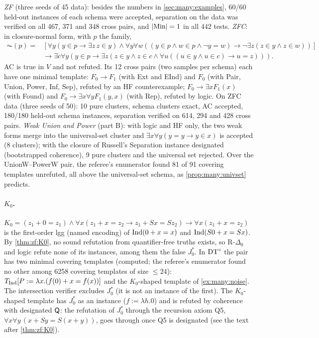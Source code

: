 \begin{example}\label{ex:many:zf}
\emph{ZF} (three seeds of 45 data): besides the numbers in \cref{sec:many:examples}, 60/60 held-out instances of each
schema were accepted, separation on the data was verified on all 467, 371 and 348 cross pairs, and $|\mathrm{Min}|=1$ in all 442
tests. \emph{ZFC}: in closure-normal form, with $p$ the family,
\begin{align*}
\AC(p)={}&[\forall y(y\in p\to\exists z\,z\in y)\wedge\forall y\forall w((y\in p\wedge w\in p\wedge\neg y=w)\to\neg\exists z(z\in y\wedge z\in w))]\\
&\to\exists c\forall y(y\in p\to\exists z(z\in y\wedge z\in c\wedge\forall u((u\in y\wedge u\in c)\to u=z))).
\end{align*} AC is true in $V$ and not
refuted. Its 12 cross pairs (two samples per schema) each have one minimal template: $F_0\to F_1$ (with Ext and EInd) and
$F_0$ (with Pair, Union, Power, Inf, Sep), refuted by an HF counterexample; $F_0\to\exists xF_1(x)$ (with Found) and
$F_0\to\exists x\forall yF_1(y,x)$ (with Rep), refuted by logic. On ZFC data (three seeds of 50): 10 pure clusters, schema clusters exact, AC
accepted, 180/180 held-out schema instances, separation verified on 614, 294 and 428 cross pairs. \emph{Weak Union and Power} (part B): with logic and HF only, the two weak
forms merge into the universal-set cluster and $\exists x\forall y(y=y\to y\in x)$ is accepted (8 clusters); with the closure of
Russell's Separation instance designated (bootstrapped coherence), 9 pure clusters and the universal set rejected. Over the
UnionW--PowerW pair, the referee's enumerator found 81 of 91 covering templates unrefuted, all above the universal-set
schema, as \cref{prop:many:univset} predicts.
\end{example}

\paragraph{$K_0$.} $K_0=(z_1+0=z_1)\wedge\forall x(z_1+x=z_2\to z_1+Sx=Sz_2)\to\forall x(z_1+x=z_2)$ is the first-order lgg
(named encoding) of $\mathrm{Ind}(0+x=x)$ and $\mathrm{Ind}(S0+x=Sx)$. By \cref{thm:zf:K0}, no sound refutation from quantifier-free truths
exists, so R-$\Delta_0$ and logic refute none of its instances, among them the false $J^*_0$. In $\mathrm{DT}^{\circ}$ the pair has two
minimal covering templates (computed; the referee's enumerator found no other among 6258 covering templates of size
$\le24$): $T_{\mathrm{Ind}}[P:=\lambda x.(f(0)+x=f(x))]$ and the $K_0$-shaped template of \cref{ex:many:noise}. The intersection
verifier excludes $J^*_0$ (it is not an instance of the first). The $K_0$-shaped template has $J^*_0$ as an instance
($f:=\lambda h.0$) and is refuted by coherence with designated $\mathsf{Q}$: the refutation of $J^*_0$ through the recursion axiom
Q5, $\forall x\forall y\,(x+Sy=S(x+y))$, goes through once Q5 is designated 
(see the text after \cref{thm:zf:K0}).

